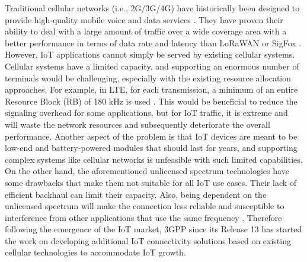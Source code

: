 \documentclass[]{IEEEtran}
\begin{document}
Traditional cellular networks (i.e., 2G/3G/4G) have historically been designed to provide high-quality mobile voice and data services \cite{noauthor_how_nodate}. They have proven their ability to deal with a large amount of traffic over a wide coverage area with a better performance in terms of data rate and latency than LoRaWAN or SigFox \cite{hwang_survey_2019}. However, IoT applications cannot simply be served by existing cellular systems. Cellular systems have a limited capacity, and supporting an enormous number of terminals would be challenging, especially with the existing resource allocation approaches. For example, in LTE, for each transmission, a minimum of an entire Resource Block (RB) of 180 kHz is used \cite{accurso_exploring_2021}. This would be beneficial to reduce the signaling overhead for some applications, but for IoT traffic, it is extreme and will waste the network resources and subsequently deteriorate the overall performance. Another aspect of the problem is that IoT devices are meant to be low-end and battery-powered modules that should last for years, and supporting complex systems like cellular networks is unfeasible with such limited capabilities.
On the other hand, the aforementioned unlicensed spectrum technologies have some drawbacks that make them not suitable for all IoT use cases. Their lack of efficient backhaul can limit their capacity. Also, being dependent on the unlicensed spectrum will make the connection less reliable and susceptible to interference from other applications that use the same frequency \cite{hwang_survey_2019}. Therefore following the emergence of the IoT market, 3GPP since its Release 13 has started the work on developing additional IoT connectivity solutions based on existing cellular technologies to accommodate IoT growth. 
\end{document}
